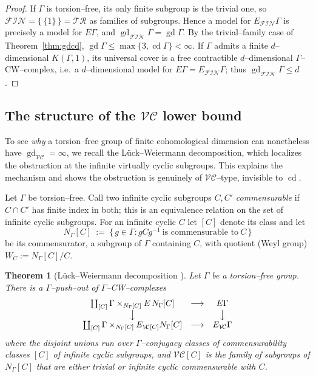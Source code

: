 \documentclass{amsart}
\newtheorem{theorem}{Theorem}
\theoremstyle{definition}
\newcommand{\FIN}{\mathcal{F\!I\!N}}
\newcommand{\VC}{\mathcal{V\!C}}
\newcommand{\gd}{\operatorname{gd}}
\newcommand{\cd}{\operatorname{cd}}
\begin{document}
\begin{proof}
If $\Gamma$ is torsion--free, its only finite subgroup is the trivial one, so
$\FIN=\{\,\{1\}\,\}=\mathcal{TR}$ as families of subgroups. Hence a model for $E_{\FIN}\Gamma$
is precisely a model for $E\Gamma$, and $\gd_{\FIN}\Gamma=\gd\Gamma$. By the trivial--family
case of Theorem~\ref{thm:gdcd}, $\gd\Gamma\le\max\{3,\cd\Gamma\}<\infty$. If $\Gamma$ admits a
finite $d$--dimensional $K(\Gamma,1)$, its universal cover is a free contractible
$d$--dimensional $\Gamma$--CW--complex, i.e.\ a $d$--dimensional model for
$E\Gamma=E_{\FIN}\Gamma$; thus $\gd_{\FIN}\Gamma\le d$.
\end{proof}

\subsection{The structure of the $\VC$ lower bound}

To see \emph{why} a torsion--free group of finite cohomological dimension can nonetheless have
$\gd_{\VC}=\infty$, we recall the Lück--Weiermann decomposition, which localizes the
obstruction at the infinite virtually cyclic subgroups. This explains the mechanism and shows
the obstruction is genuinely of $\VC$--type, invisible to $\cd$.

Let $\Gamma$ be torsion--free. Call two infinite cyclic subgroups $C,C'$ \emph{commensurable}
if $C\cap C'$ has finite index in both; this is an equivalence relation on the set of infinite
cyclic subgroups. For an infinite cyclic $C$ let $[C]$ denote its class and let
\[
N_\Gamma[C]\ :=\ \{\,g\in\Gamma : g C g^{-1}\ \text{is commensurable to}\ C\,\}
\]
be its commensurator, a subgroup of $\Gamma$ containing $C$, with quotient (Weyl group)
$W_C:=N_\Gamma[C]/C$.

\begin{theorem}[Lück--Weiermann decomposition {\cite[Cor.~2.11, \S 5]{LueckWeiermann}}]\label{thm:LW}
Let $\Gamma$ be a torsion--free group. There is a $\Gamma$--push--out of
$\Gamma$--CW--complexes
\[
\begin{array}{ccc}
\coprod_{[C]} \Gamma\times_{N_\Gamma[C]} E\,N_\Gamma[C] & \longrightarrow & E\Gamma\\
\big\downarrow & & \big\downarrow\\
\coprod_{[C]} \Gamma\times_{N_\Gamma[C]} E_{\VC[C]}N_\Gamma[C] & \longrightarrow & E_{\VC}\Gamma
\end{array}
\]
where the disjoint unions run over $\Gamma$--conjugacy classes of commensurability classes
$[C]$ of infinite cyclic subgroups, and $\VC[C]$ is the family of subgroups of $N_\Gamma[C]$
that are either trivial or infinite cyclic commensurable with $C$.
\end{theorem}
\end{document}
